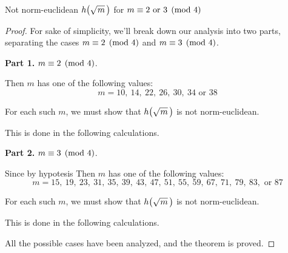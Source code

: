 \begin{subsection}{Not norm-euclidean $\hh{m}$ for %
                   $m \equiv 2 \text{ or } 3 \pmod 4$}
\begin{proof}
For sake of simplicity, we'll break down our analysis
into two parts, separating the cases
$m \equiv 2 \pmod 4$ and $m \equiv 3 \pmod 4$.

\medskip
\textbf{Part 1.\:} $m \equiv 2 \pmod 4$.

\smallskip

Then $m$ has one of the following values:
\begin{displaymath}
m = 10,\ 14,\ 22,\ 26,\ 30,\ 34 \text{ or } 38
\end{displaymath}

For each such $m$, we must show that $\hh{m}$ is not norm-euclidean.

\medskip
This is done in the following calculations.



\medskip
\textbf{Part 2.\:} $m \equiv 3 \pmod 4$.

\smallskip

Since by hypotesis Then $m$ has one of the following values:
\begin{displaymath}
m = 15,\ 19,\ 23,\ 31,\ 35,\ 39,\ 43,\ 47,\ 51,\ 55,\ 59,\ 67,\ %
    71,\ 79,\ 83, \text{ or } 87
\end{displaymath}

For each such $m$, we must show that $\hh{m}$ is not norm-euclidean.

\medskip
This is done in the following calculations.



All the possible cases have been analyzed, and the
theorem is proved.
%
\end{proof}

\end{subsection}


